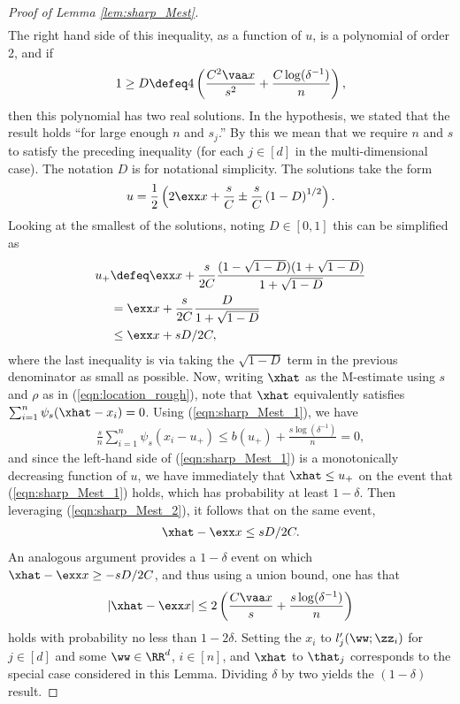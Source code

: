 \documentclass[11pt,oneside]{article}
\theoremstyle{definition} \newtheorem{defn}{Definition}       %
\theoremstyle{plain} \newtheorem{prop}[defn]{Proposition}           %
\theoremstyle{plain} \newtheorem{thm}[defn]{Theorem}                %
\theoremstyle{plain} \newtheorem{lem}[defn]{Lemma}                  %
\theoremstyle{plain} \newtheorem{cor}[defn]{Corollary}              %
\theoremstyle{remark} \newtheorem{rmk}[defn]{Remark}                %
\theoremstyle{remark} \newtheorem{ex}[defn]{Example}                %
\begin{document}
\begin{proof}[Proof of Lemma \ref{lem:sharp_Mest}]
\begin{align}
\end{align}
%
The right hand side of this inequality, as a function of $u$, is a polynomial of order 2, and if
%
\begin{align*}
1 \geq D \defeq 4\left(\frac{C^2\vaa x}{s^2} + \frac{C\log(\delta^{-1})}{n}\right),
\end{align*}
%
then this polynomial has two real solutions. In the hypothesis, we stated that the result holds ``for large enough $n$ and $s_{j}$.'' By this we mean that we require $n$ and $s$ to satisfy the preceding inequality (for each $j \in [d]$ in the multi-dimensional case). The notation $D$ is for notational simplicity. The solutions take the form
%
\begin{align*}
u = \frac{1}{2}\left(2\exx x + \frac{s}{C} \pm \frac{s}{C}\left(1-D\right)^{1/2}\right).
\end{align*}
%
Looking at the smallest of the solutions, noting $D \in [0,1]$ this can be simplified as
%
\begin{align}\label{eqn:sharp_Mest_2}
u_{+} & \defeq \exx x + \frac{s}{2C}\frac{(1-\sqrt{1-D})(1+\sqrt{1-D})}{1+\sqrt{1-D}}\nonumber\\
& = \exx x + \frac{s}{2C}\frac{D}{1+\sqrt{1-D}}\nonumber\\
& \leq \exx x + sD/2C,
\end{align}
%
where the last inequality is via taking the $\sqrt{1-D}$ term in the previous denominator as small as possible. Now, writing $\xhat$ as the M-estimate using $s$ and $\rho$ as in (\ref{eqn:location_rough}), note that $\xhat$ equivalently satisfies $\sum_{i=1}^{n}\psi_{s}(\xhat-x_{i})=0$. Using (\ref{eqn:sharp_Mest_1}), we have
%
\begin{align*}
\frac{s}{n}\sum_{i=1}^{n}\psi_{s}(x_{i}-u_{+}) \leq b(u_{+}) + \frac{s\log(\delta^{-1})}{n} = 0,
\end{align*}
%
and since the left-hand side of (\ref{eqn:sharp_Mest_1}) is a monotonically decreasing function of $u$, we have immediately that $\xhat \leq u_{+}$ on the event that (\ref{eqn:sharp_Mest_1}) holds, which has probability at least $1-\delta$. Then leveraging (\ref{eqn:sharp_Mest_2}), it follows that on the same event,
%
\begin{align*}
\xhat-\exx x \leq sD/2C.
\end{align*}
%
An analogous argument provides a $1-\delta$ event on which $\xhat-\exx x \geq -sD/2C$, and thus using a union bound, one has that
%
\begin{align}\label{eqn:sharp_Mest_3}
|\xhat-\exx x| \leq 2\left( \frac{C \vaa x}{s} + \frac{s\log(\delta^{-1})}{n} \right)
\end{align}
%
holds with probability no less than $1-2\delta$. Setting the $x_{i}$ to $l_{j}^{\prime}(\ww;\zz_{i})$ for $j \in [d]$ and some $\ww \in \RR^{d}$, $i \in [n]$, and $\xhat$ to $\that_{j}$ corresponds to the special case considered in this Lemma. Dividing $\delta$ by two yields the $(1-\delta)$ result.
\end{proof}
\end{document}
